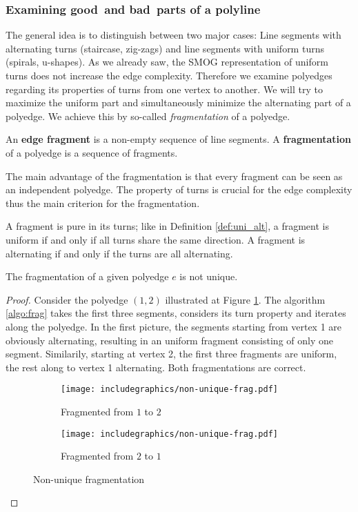 \subsubsection{Examining \grqq good\grqq~and \grqq bad\grqq~parts of a polyline}
The general idea is to distinguish between two major cases: Line segments with alternating turns (staircase, zig-zags) and line segments with uniform turns (spirals, u-shapes). As we already saw, the SMOG representation of uniform turns does not increase the edge complexity. Therefore we examine polyedges regarding its properties of turns from one vertex to another. We will try to maximize the uniform part and simultaneously minimize the alternating part of a polyedge. We achieve this by so-called \textit{fragmentation} of a polyedge.
\begin{definition}
	An \textbf{edge fragment} is a non-empty sequence of line segments. A \textbf{fragmentation} of a polyedge is a sequence of fragments.
\end{definition}
The main advantage of the fragmentation is that every fragment can be seen as an independent polyedge.
The property of turns is crucial for the edge complexity thus the main criterion for the fragmentation.
\begin{definition}
	A fragment is pure in its turns; like in Definition \ref{def:uni_alt}, a fragment is uniform if and only if all turns share the same direction. A fragment is alternating if and only if the turns are all alternating.
\end{definition}
\begin{lemma} The fragmentation of a given polyedge $e$ is not unique.
\end{lemma}
\begin{proof}
	Consider the polyedge $(1,2)$ illustrated at Figure \ref{im:nonunique}. The algorithm \ref{algo:frag} takes the first three segments, considers its turn property and iterates along the polyedge. In the first picture, the segments starting from vertex 1 are obviously alternating, resulting in an uniform fragment consisting of only one segment. Similarily, starting at vertex 2, the first three fragments are uniform, the rest along to vertex 1 alternating. Both fragmentations are correct.
	\begin{figure}[H]
		\centering
		\begin{subfigure}{0.4\textwidth}
			\centering
			\texttt{[image: includegraphics/non-unique-frag.pdf]}
			\caption{Fragmented from $1$ to $2$}
		\end{subfigure}
		\begin{subfigure}{0.4\textwidth}
			\centering
			\texttt{[image: includegraphics/non-unique-frag.pdf]}
			\caption{Fragmented from $2$ to $1$}
		\end{subfigure}
		\caption{Non-unique fragmentation}\label{im:nonunique}
	\end{figure}
\end{proof}

